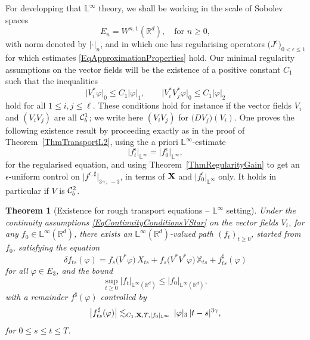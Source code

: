 \documentclass[11pt,a4paper]{amsart}
\newcommand{\RR}{\mathbb{R}}  \newcommand{\CC}{\mathbb{C}}  \newcommand{\LL}{\mathbb{L}}  \newcommand{\WW}{\mathbb{W}}
\newcommand{\bbX}{\mathbb{X}}
\newcommand{\ep}{\epsilon}
\renewcommand{\leq}{\leqslant}
\renewcommand{\geq}{\geqslant}
\newcommand{\ssk}{\smallskip}
\newtheorem{thm}{\hspace{-0.15cm}  {\sc Theorem} } %
\numberwithin{equation}{section} %
\begin{document}
For developping that $\LL^\infty$ theory, we shall be working in the scale of Sobolev spaces 
$$
E_n = W^{n,1}(\RR^d),\quad\textrm{for } n\geq 0,
$$
with norm denoted by $|\cdot|_n$, and in which one has regularising operators $\big(J^\ep\big)_{0<\epsilon\leq 1}$ for which estimates \eqref{EqApproximationProperties} hold. Our minimal regularity assumptions on the vector fields will be the existence of a positive constant $C_1$ such that the inequalities
\begin{equation}
\label{EqContinuityConditionsVStar}
\big|V_i^*\varphi\big|_0 \leq C_1 |\varphi|_1, \quad\quad \big|V_i^*V_j^*\varphi\big|_0 \leq C_1 |\varphi|_2
\end{equation}
hold for all $1\leq i,j\leq\ell$. These conditions hold for instance if the vector fields $V_i$ and $(V_iV_j)$ are all $\mathcal{C}^1_b$; we write here $(V_iV_j)$ for $\big(DV_j\big)(V_i)$. One proves the following existence result by proceeding exactly as in the proof of Theorem~\ref{ThmTransportL2}, using the a priori $\LL^\infty$-estimate
$$
\big| f_t^\ep \big|_{\LL^\infty} = \big|f_0^\ep\big|_{\LL^\infty},
$$
for the regularised equation, and using Theorem~\ref{ThmRegularityGain} to get an $\epsilon$-uniform control on $\big|f^{\epsilon,\sharp}\big|_{3\gamma\,;\,-3}$, in terms of ${\bf X}$ and $\big|f_0^\ep\big|_{\LL^\infty}$ only. It holds in particular if $V$ is $\mathcal{C}^2_b$.

\ssk 
 
\begin{thm}[Existence for rough transport equations -- $\LL^\infty$ setting]
\label{ThmExistenceTransportEquationLInfty}
Under the continuity assumptions \eqref{EqContinuityConditionsVStar} on the vector fields $V_i$, for any $f_0\in\LL^\infty(\RR^d)$, there exists an $\LL^\infty(\RR^d)$-valued path $(f_t)_{t\geq 0}$, started from $f_0$, satisfying the equation
$$
\delta f_{ts}(\varphi) = f_s\big(V^*\varphi\big)\,X_{ts} + f_s\big(V^*V^*\varphi\big)\,\bbX_{ts} + f^\sharp_{ts}(\varphi)
$$
for all $\varphi\in E_3$, and the bound
$$ 
\sup_{t\geq 0} \big| f_t\big|_{\LL^\infty(\RR^d)}\leq \big| f_0\big|_{\LL^\infty(\RR^d)},
$$ 
with a remainder $f^\sharp(\varphi)$ controlled by 
\begin{equation}
\label{EqBoundRemainder-bis}
\big|f^\sharp_{ts}(\varphi) \big| \lesssim_{C_1,{\bfX}, T, |f_0|_{\LL^\infty}} \, |\varphi|_3\,|t-s|^{3\gamma},
\end{equation}
for $0\leq s\leq t\leq T$. 
\end{thm} 
 

\bigskip
\end{document}
